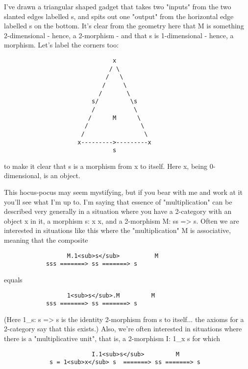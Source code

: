 I've drawn a triangular shaped gadget that takes two "inputs"
from the two slanted edges labelled s, and spits out one "output"
from the horizontal edge labelled s on the bottom.   It's clear
from the geometry here that M is something 2-dimensional - hence, a
2-morphism - and that s is 1-dimensional - hence, a morphism.
Let's label the corners too:

\begin{verbatim}
                               x
                              / \
                             /   \
                            /     \
                           /       \
                         s/         \s
                         /           \
                        /      M      \
                       /               \
                      /                 \
                     x--------->---------x
                               s

\end{verbatim}
    
to make it clear that s is a morphism from x to itself.  Here x,
being 0-dimensional, is an object. 

This hocus-pocus may seem mystifying, but if you bear with me and work
at it you'll see what I'm up to.  I'm saying that essence of
"multiplication" can be described very generally in a situation where
you have a 2-category with an object x in it, a morphism s: x \to  x, and
a 2-morphism M: ss => s.  Often we are interested in situations like
this where the "multiplication" M is associative, meaning that the
composite

\begin{verbatim}
                  M.1<sub>s</sub>          M
            sss =======> ss =======> s

\end{verbatim}
    
equals

\begin{verbatim}
                  1<sub>s</sub>.M         M
            sss =======> ss =======> s

\end{verbatim}
    
(Here 1_{s}: s => s is the identity 2-morphism from s to itself... the axioms
for a 2-category say that this exists.)  Also, we're often interested in
situations where there is a "multiplicative unit", that is, a 2-morphism
I: 1_{x} \to  s for which

\begin{verbatim}
                         I.1<sub>s</sub>         M
             s = 1<sub>x</sub> s  =======> ss =======> s

\end{verbatim}
    
